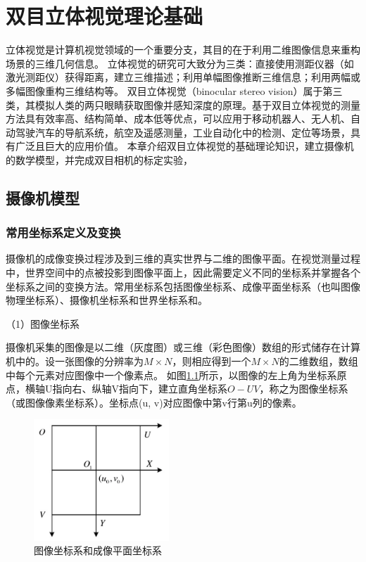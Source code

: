 
\chapter{双目立体视觉理论基础}
立体视觉是计算机视觉领域的一个重要分支，其目的在于利用二维图像信息来重构场景的三维几何信息。
立体视觉的研究可大致分为三类：直接使用测距仪器（如激光测距仪）获得距离，建立三维描述；利用单幅图像推断三维信息；利用两幅或多幅图像重构三维结构等。
双目立体视觉（binocular stereo vision）属于第三类，其模拟人类的两只眼睛获取图像并感知深度的原理。基于双目立体视觉的测量方法具有效率高、结构简单、成本低等优点，可以应用于移动机器人、无人机、自动驾驶汽车的导航系统，航空及遥感测量，工业自动化中的检测、定位等场景，具有广泛且巨大的应用价值。
本章介绍双目立体视觉的基础理论知识，建立摄像机的数学模型，并完成双目相机的标定实验，

\section{摄像机模型}
\subsection{常用坐标系定义及变换}
摄像机的成像变换过程涉及到三维的真实世界与二维的图像平面。在视觉测量过程中，世界空间中的点被投影到图像平面上，因此需要定义不同的坐标系并掌握各个坐标系之间的变换方法。常用坐标系包括图像坐标系、成像平面坐标系（也叫图像物理坐标系）、摄像机坐标系和世界坐标系和。

（1）图像坐标系

摄像机采集的图像是以二维（灰度图）或三维（彩色图像）数组的形式储存在计算机中的。设一张图像的分辨率为$M\times N$，则相应得到一个$M\times N$的二维数组，数组中每个元素对应图像中一个像素点。 如图\ref{fig:2_1_image_coord}所示，以图像的左上角为坐标系原点，横轴U指向右、纵轴V指向下，建立直角坐标系$O-UV$，称之为图像坐标系（或图像像素坐标系）。坐标点(u, v)对应图像中第v行第u列的像素。

\begin{figure}[!htb] %
	\centering
	\includegraphics[width=2in]{figures/2_1_image_coord}
	\caption{图像坐标系和成像平面坐标系}\label{fig:2_1_image_coord}
\end{figure}


